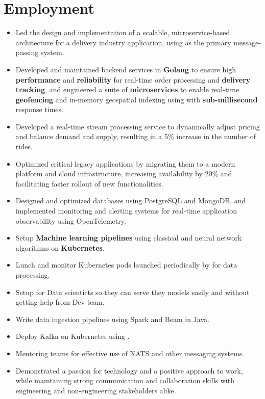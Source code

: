 \section{Employment}

\vspace{0.5cm}
\begin{itemize}
  \item Led the design and implementation of a scalable, microservice-based architecture for a delivery industry application,
    using  as the primary message-passing system.
  \item Developed and maintained backend services in \textbf{Golang} to ensure
    high \textbf{performance} and \textbf{reliability} for real-time order processing and \textbf{delivery tracking},
    and engineered a suite of \textbf{microservices} to enable real-time \textbf{geofencing} and in-memory geospatial
    indexing using  with \textbf{sub-millisecond} response times.
  \item Developed a real-time stream processing service to dynamically adjust pricing and balance demand and supply,
    resulting in a 5\% increase in the number of rides.
  \item Optimized critical legacy applications by migrating them to a modern platform and cloud infrastructure,
    increasing availability by 20\% and facilitating faster rollout of new functionalities.
  \item Designed and optimized databases using PostgreSQL and MongoDB,
    and implemented monitoring and alerting systems for real-time application observability using OpenTelemetry.
  \item Setup \textbf{Machine learning pipelines} using classical and neural network algorithms on \textbf{Kubernetes}.
  \item Lunch and monitor Kubernetes pods launched periodically by  for data processing.
  \item Setup  for Data scienticts so they can serve they models easily and without getting help from Dev team.
  \item Write data ingestion pipelines using Spark and Beam in Java.
  \item Deploy Kafka on Kubernetes using .
  \item Mentoring teams for effective use of NATS and other messaging systems.
  \item Demonstrated a passion for technology and a positive approach to work,
    while maintaining strong communication and collaboration skills with engineering
    and non-engineering stakeholders alike.
\end{itemize}

